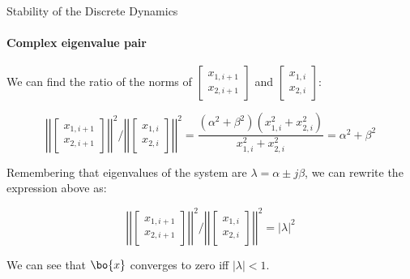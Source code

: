 \documentclass{beamer}
\begin{document}
\begin{frame}{Stability of the Discrete Dynamics}
	\framesubtitle{Complex eigenvalue pair}
	\begin{flushleft}
		
		We can find the ratio of the norms of $\begin{bmatrix}
			x_{1, i+1} \\ x_{2, i+1}
		\end{bmatrix}$ and $\begin{bmatrix}
			x_{1, i} \\ x_{2, i}
		\end{bmatrix}$: 
		
		
		
		\begin{equation}
			\left | \left|
			\begin{bmatrix}
				x_{1, i+1} \\ x_{2, i+1}
			\end{bmatrix}
			\right | \right|^2 
			/ 
			\left | \left|
			\begin{bmatrix}
				x_{1, i} \\ x_{2, i}
			\end{bmatrix}
			\right | \right|^2
			=
			\frac{(\alpha^2 + \beta^2) (x_{1, i}^2 + x_{2, i}^2)}{x_{1, i}^2 + x_{2, i}^2}
			= 
			\alpha^2 + \beta^2
		\end{equation}
		
		Remembering that eigenvalues of the system are $\lambda  = \alpha \pm j\beta$, we can rewrite the expression above as:
		
		\begin{equation}
	\left | \left|
	\begin{bmatrix}
		x_{1, i+1} \\ x_{2, i+1}
	\end{bmatrix}
	\right | \right|^2 
	/ 
	\left | \left|
	\begin{bmatrix}
		x_{1, i} \\ x_{2, i}
	\end{bmatrix}
	\right | \right|^2
	= 
	| \lambda |^2
		\end{equation}		
		
		We can see that $\bo{x}$  converges to zero iff $|\lambda| < 1$.
		
	\end{flushleft}
\end{frame}
\end{document}
